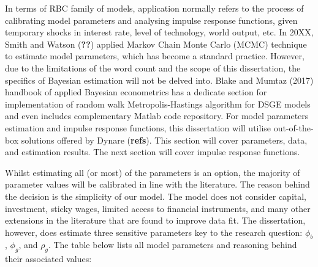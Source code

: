 In terms of RBC family of models, application normally refers to the process of calibrating model parameters and analysing impulse response functions, given temporary shocks in interest rate, level of technology, world output, etc. In 20XX, Smith and Watson (\textbf{??}) applied Markov Chain Monte Carlo (MCMC) technique to estimate model parameters, which has become a standard practice. However, due to the limitations of the word count and the scope of this dissertation, the specifics of Bayesian estimation will not be delved into. Blake and Mumtaz (2017) handbook of applied Bayesian econometrics has a dedicate section for implementation of random walk Metropolis-Hastings algorithm for DSGE models and even includes complementary Matlab code repository. For model parameters estimation and impulse response functions, this dissertation will utilise out-of-the-box solutions offered by Dynare (\textbf{refs}). This section will cover parameters, data, and estimation results. The next section will cover impulse response functions.

Whilst estimating all (or most) of the parameters is an option, the majority of parameter values will be calibrated in line with the literature. The reason behind the decision is the simplicity of our model. The model does not consider capital, investment, sticky wages, limited access to financial instruments, and many other extensions in the literature that are found to improve data fit. The dissertation, however, does estimate three sensitive parameters key to the research question: $\phi_b$, $\phi_g$, and $\rho_g$. The table below lists all model parameters and reasoning behind their associated values:

